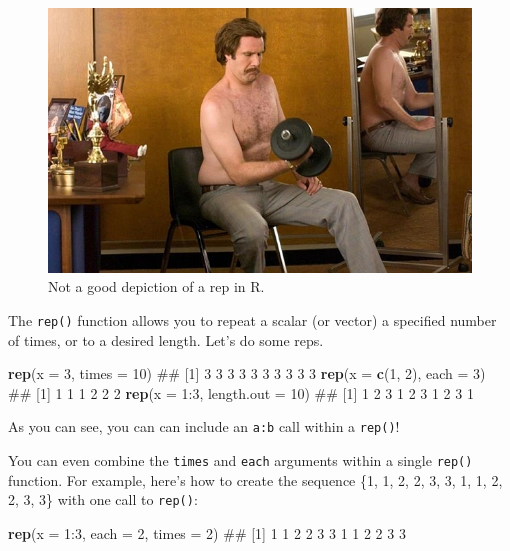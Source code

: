 \documentclass[]{book}
\newenvironment{Shaded}{\begin{snugshade}}{\end{snugshade}}
\newcommand{\KeywordTok}[1]{\textcolor[rgb]{0.13,0.29,0.53}{\textbf{{#1}}}}
\newcommand{\DataTypeTok}[1]{\textcolor[rgb]{0.13,0.29,0.53}{{#1}}}
\newcommand{\DecValTok}[1]{\textcolor[rgb]{0.00,0.00,0.81}{{#1}}}
\newcommand{\NormalTok}[1]{{#1}}
\theoremstyle{definition}
\theoremstyle{definition}
\theoremstyle{remark}
\begin{document}
\begin{figure}

{\centering \includegraphics[width=0.5\linewidth]{images/rep} 

}

\caption{Not a good depiction of a rep in R.}\label{fig:rep}
\end{figure}

The \texttt{rep()} function allows you to repeat a scalar (or vector) a
specified number of times, or to a desired length. Let's do some reps.

\begin{Shaded}
\begin{Highlighting}[]
\KeywordTok{rep}\NormalTok{(}\DataTypeTok{x =} \DecValTok{3}\NormalTok{, }\DataTypeTok{times =} \DecValTok{10}\NormalTok{)}
\NormalTok{##  [1] 3 3 3 3 3 3 3 3 3 3}
\KeywordTok{rep}\NormalTok{(}\DataTypeTok{x =} \KeywordTok{c}\NormalTok{(}\DecValTok{1}\NormalTok{, }\DecValTok{2}\NormalTok{), }\DataTypeTok{each =} \DecValTok{3}\NormalTok{)}
\NormalTok{## [1] 1 1 1 2 2 2}
\KeywordTok{rep}\NormalTok{(}\DataTypeTok{x =} \DecValTok{1}\NormalTok{:}\DecValTok{3}\NormalTok{, }\DataTypeTok{length.out =} \DecValTok{10}\NormalTok{)}
\NormalTok{##  [1] 1 2 3 1 2 3 1 2 3 1}
\end{Highlighting}
\end{Shaded}

As you can see, you can can include an \texttt{a:b} call within a
\texttt{rep()}!

You can even combine the \texttt{times} and \texttt{each} arguments
within a single \texttt{rep()} function. For example, here's how to
create the sequence \{1, 1, 2, 2, 3, 3, 1, 1, 2, 2, 3, 3\} with one call
to \texttt{rep()}:

\begin{Shaded}
\begin{Highlighting}[]
\KeywordTok{rep}\NormalTok{(}\DataTypeTok{x =} \DecValTok{1}\NormalTok{:}\DecValTok{3}\NormalTok{, }\DataTypeTok{each =} \DecValTok{2}\NormalTok{, }\DataTypeTok{times =} \DecValTok{2}\NormalTok{)}
\NormalTok{##  [1] 1 1 2 2 3 3 1 1 2 2 3 3}
\end{Highlighting}
\end{Shaded}
\end{document}

